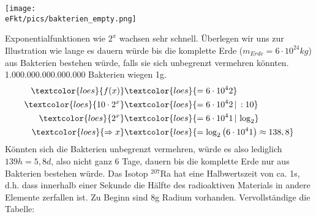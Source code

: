 \begin{minipage}{0.49\textwidth}\centering
	\texttt{[image: \\eFkt/pics/bakterien\_empty.png]}
\end{minipage}
Exponentialfunktionen wie \(2^x\) wachsen sehr schnell. Überlegen wir uns zur Illustration wie lange es dauern würde bis die komplette Erde (\(m_{Erde}=6\cdot 10^{24}kg\)) aus Bakterien bestehen würde, falls sie sich unbegrenzt vermehren könnten. 1.000.000.000.000.000 Bakterien wiegen 1g.
\begin{align*}
	\textcolor{loes}{f(x)}&\textcolor{loes}{=6\cdot 10^42}\\
	\textcolor{loes}{10\cdot 2^x}&\textcolor{loes}{=6\cdot 10^42\,|\,:10}\\
	\textcolor{loes}{2^x}&\textcolor{loes}{=6\cdot 10^41\,|\,\log_2}\\
	\textcolor{loes}{\Rightarrow x}&\textcolor{loes}{=\log_2\left( 6\cdot 10^41\right) \approx 138,8}
\end{align*}
\textcolor{loes}{Könnten sich die Bakterien unbegrenzt vermehren, würde es also lediglich \(139h=5,8d\), also nicht ganz 6 Tage, dauern bis die komplette Erde nur aus Bakterien bestehen würde.}
\newpage
Das Isotop \(^{207}\)Ra hat eine Halbwertszeit von ca. 1s, d.h. dass innerhalb einer Sekunde die Hälfte des radioaktiven Materials in andere Elemente zerfallen ist. Zu Beginn sind 8g Radium vorhanden. Vervollständige die Tabelle:\\
\vspace{0.3cm}\\
